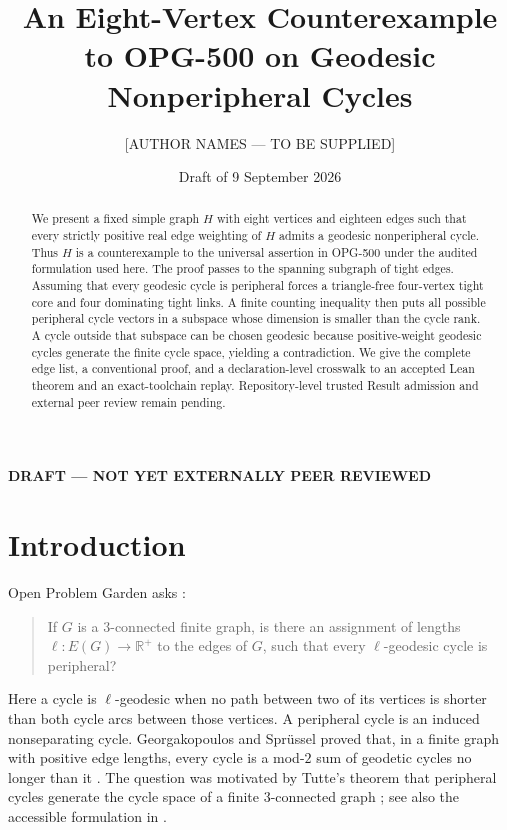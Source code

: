 \documentclass[11pt]{amsart}
\title[OPG-500 eight-vertex counterexample]{An Eight-Vertex Counterexample to OPG-500 on Geodesic Nonperipheral Cycles}
\author{[AUTHOR NAMES --- TO BE SUPPLIED]}
\date{Draft of 9 September 2026}
\theoremstyle{definition}
\newcommand{\DraftLabel}{\textcolor{red!70!black}{\bfseries DRAFT --- NOT YET EXTERNALLY PEER REVIEWED}}
\begin{document}
\begin{abstract}
We present a fixed simple graph $H$ with eight vertices and eighteen edges such that every strictly positive real edge weighting of $H$ admits a geodesic nonperipheral cycle.  Thus $H$ is a counterexample to the universal assertion in OPG-500 under the audited formulation used here.  The proof passes to the spanning subgraph of tight edges.  Assuming that every geodesic cycle is peripheral forces a triangle-free four-vertex tight core and four dominating tight links.  A finite counting inequality then puts all possible peripheral cycle vectors in a subspace whose dimension is smaller than the cycle rank.  A cycle outside that subspace can be chosen geodesic because positive-weight geodesic cycles generate the finite cycle space, yielding a contradiction.  We give the complete edge list, a conventional proof, and a declaration-level crosswalk to an accepted Lean theorem and an exact-toolchain replay.  Repository-level trusted Result admission and external peer review remain pending.
\end{abstract}

\maketitle
\begin{center}\DraftLabel\end{center}

\section{Introduction}

Open Problem Garden asks \cite{OPG500}:
\begin{quote}
If $G$ is a $3$-connected finite graph, is there an assignment of lengths $\ell:E(G)\to\mathbb R^+$ to the edges of $G$, such that every $\ell$-geodesic cycle is peripheral?
\end{quote}
Here a cycle is $\ell$-geodesic when no path between two of its vertices is shorter than both cycle arcs between those vertices.  A peripheral cycle is an induced nonseparating cycle.  Georgakopoulos and Spr\"ussel proved that, in a finite graph with positive edge lengths, every cycle is a mod-$2$ sum of geodetic cycles no longer than it \cite[Theorem~3.1]{GeorgakopoulosSpruessel2009}.  The question was motivated by Tutte's theorem that peripheral cycles generate the cycle space of a finite $3$-connected graph \cite{Tutte1963}; see also the accessible formulation in \cite[Theorem~1.3]{Kelmans2006}.
\end{document}
